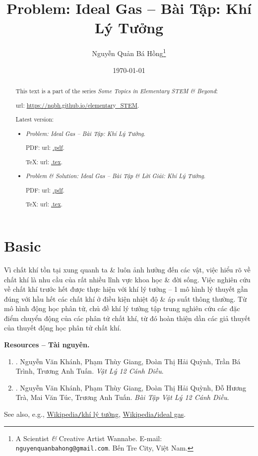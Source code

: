 \documentclass{article}
\title{Problem: Ideal Gas -- Bài Tập: Khí Lý Tưởng}
\author{Nguyễn Quản Bá Hồng\footnote{A Scientist {\it\&} Creative Artist Wannabe. E-mail: {\tt nguyenquanbahong@gmail.com}. Bến Tre City, Việt Nam.}}
\date{\today}
\begin{document}
\maketitle
\begin{abstract}
	This text is a part of the series {\it Some Topics in Elementary STEM \& Beyond}:
	
	{\sc url}: \url{https://nqbh.github.io/elementary_STEM}.
	
	Latest version:
	\begin{itemize}
		\item {\it Problem: Ideal Gas -- Bài Tập: Khí Lý Tưởng}.
		
		PDF: {\sc url}: \url{.pdf}.
		
		\TeX: {\sc url}: \url{.tex}.
		\item {\it Problem \& Solution: Ideal Gas -- Bài Tập \& Lời Giải: Khí Lý Tưởng}.
		
		PDF: {\sc url}: \url{.pdf}.
		
		\TeX: {\sc url}: \url{.tex}.
	\end{itemize}
\end{abstract}
\tableofcontents


\section{Basic}
Vì chất khí tồn tại xung quanh ta \& luôn ảnh hưởng đến các vật, việc hiểu rõ về chất khí là nhu cầu của rất nhiều lĩnh vực khoa học \& đời sống. Việc nghiên cứu về chất khí trước hết được thực hiện với khí lý tưởng -- 1 mô hình lý thuyết gần đúng với hầu hết các chất khí ở điều kiện nhiệt độ \& áp suất thông thường. Từ mô hình động học phân tử, chủ đề khí lý tưởng tập trung nghiên cứu các đặc điểm chuyển động của các phân tử chất khí, từ đó hoàn thiện dần các giả thuyết của thuyết động học phân tử chất khí.

\noindent\textbf{\textsf{Resources -- Tài nguyên.}}
\begin{enumerate}
	\item \cite[Chủ đề 2: {\it Khí Lý Tưởng}]{SGK_Vat_Ly_12_CD}. {\sc Nguyễn Văn Khánh, Phạm Thùy Giang, Đoàn Thị Hải Quỳnh, Trần Bá Trình, Trương Anh Tuấn}. {\it Vật Lý 12 Cánh Diều}.
	
	\item \cite[Chủ đề 1: {\it Khí Lý Tưởng}]{SBT_Vat_Ly_12_CD}. {\sc Nguyễn Văn Khánh, Phạm Thùy Giang, Đoàn Thị Hải Quỳnh, Đỗ Hương Trà, Mai Văn Túc, Trương Anh Tuấn}. {\it Bài Tập Vật Lý 12 Cánh Diều}.
\end{enumerate}
See also, e.g., \href{https://vi.wikipedia.org/wiki/Kh%C3%AD_l%C3%BD_t%C6%B0%E1%BB%9Fng}{Wikipedia{\tt/}khí lý tưởng}, \href{https://en.wikipedia.org/wiki/Ideal_gas}{Wikipedia{\tt/}ideal gas}.
\end{document}
